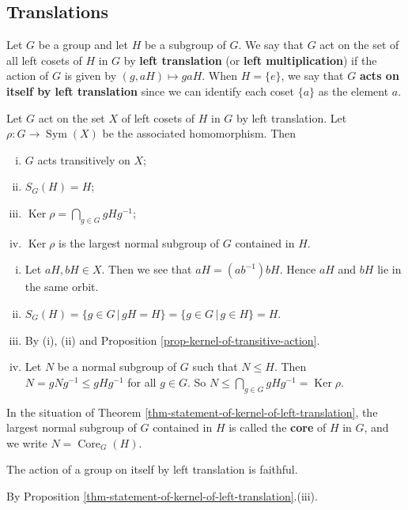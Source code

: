 \subsection{Translations}
\begin{definition}
	Let $G$ be a group and let $H$ be a subgroup of $G$. We say that $G$ act on the set of all left cosets of $H$ in $G$ by \textbf{left translation} (or \textbf{left multiplication}) if the action of $G$ is given by $(g,aH) \mapsto gaH$. When $H = \{e\}$, we say that $G$ \textbf{acts on itself by left translation} since we can identify each coset $\{a\}$ as the element $a$.
\end{definition}
\begin{theorem} \label{thm-statement-of-kernel-of-left-translation}
	Let $G$ act on the set $X$ of left cosets of $H$ in $G$ by left translation. Let $\rho:G\rightarrow \operatorname{Sym}(X)$ be the associated homomorphism. Then
	\begin{enumerate}[(i)]
		\item $G$ acts transitively on $X$;
		\item $S_G(H) = H$;
		\item $\operatorname{Ker} \rho  = \bigcap_{g\in G} gHg^{-1}$;
		\item $\operatorname{Ker} \rho$ is the largest normal subgroup of $G$ contained in $H$.
	\end{enumerate}
\end{theorem}
\begin{sketch}
	\begin{enumerate}[(i)]
		\item Let $aH,bH\in X$. Then we see that $aH= (ab^{-1})bH$. Hence $aH$ and $bH$ lie in the same orbit.
		\item $S_{G}(H) = \{g\in G\,|\, gH = H\} = \{g\in G\,|\, g\in H\} = H$.
		\item By (i), (ii) and Proposition \ref{prop-kernel-of-transitive-action}.
		\item Let $N$ be a normal subgroup of $G$ such that $N\leq H$. Then $N = gNg^{-1}\leq gHg^{-1}$ for all $g\in G$. So $N\leq \bigcap_{g\in G} gHg^{-1} = \operatorname{Ker}\rho$. \qedhere
	\end{enumerate}
\end{sketch}
In the situation of Theorem \ref{thm-statement-of-kernel-of-left-translation}, the largest normal subgroup of $G$ contained in $H$ is called the \textbf{core} of $H$ in $G$, and we write $N = \operatorname{Core}_G(H)$. 
\begin{corollary}\label{cor-action-on-itself-by-trans-is-faithful}
	The action of a group on itself by left translation is faithful.
\end{corollary}
\begin{sketch}
	By Proposition \ref{thm-statement-of-kernel-of-left-translation}.(iii).
\end{sketch}

